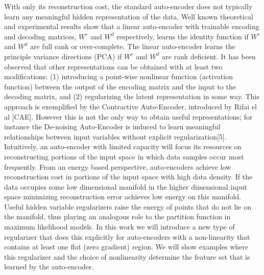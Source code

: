 \documentclass{article} %
\begin{document}
\noindent
With only its reconstruction cost, the standard auto-encoder does not typically
learn any meaningful hidden representation of the data. Well known theoretical
and experimental results show that a linear auto-encoder with trainable
encoding and decoding matrices, $W^e$ and $W^d$ respectively, learns the
identity function if $W^e$ and $W^d$ are full rank or over-complete. The linear
auto-encoder learns the principle variance directions (PCA) if $W^e$ and $W^d$
are rank deficient. It has been observed that other representations can be
obtained with at least two modifications: (1) introducing a point-wise
nonlinear function (activation function) between the output of the encoding
matrix and the input to the decoding matrix, and (2) regularizing the latent
representation in some way. This approach is exemplified by the Contractive
Auto-Encoder, introduced by Rifai el al [CAE]. However this is not the only way
to obtain useful representations; for instance the De-noising Auto-Encoder is
induced to learn meaningful relationships between input variables without
explicit regularization[5]. Intuitively, an auto-encoder with limited capacity
will focus its resources on reconstructing portions of the input space in which
data samples occur most frequently. From an energy based perspective,
auto-encoders achieve low reconstruction cost in portions of the input space
with high data density. If the data occupies some low dimensional manifold in
the higher dimensional input space minimizing reconstruction error achieves low
energy on this manifold. Useful hidden variable regularizers raise the energy
of points that do not lie on the manifold, thus playing an analogous role to
the partition function in maximum likelihood models. In this work we will
introduce a new type of regularizer that does this explicitly for auto-encoders
with a non-linearity that contains at least one flat (zero gradient) region. We
will show examples where this regularizer and the choice of nonlinearity
determine the feature set that is learned by the auto-encoder.      
\end{document}

